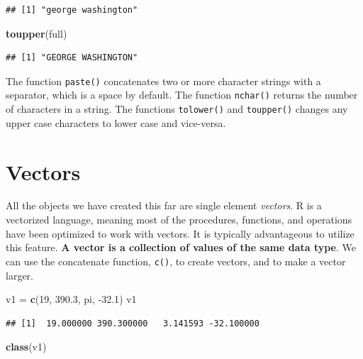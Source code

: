 \documentclass[
]{book}
\newenvironment{Shaded}{\begin{snugshade}}{\end{snugshade}}
\newcommand{\DecValTok}[1]{\textcolor[rgb]{0.00,0.00,0.81}{#1}}
\newcommand{\FloatTok}[1]{\textcolor[rgb]{0.00,0.00,0.81}{#1}}
\newcommand{\KeywordTok}[1]{\textcolor[rgb]{0.13,0.29,0.53}{\textbf{#1}}}
\newcommand{\NormalTok}[1]{#1}
\newcommand{\StringTok}[1]{\textcolor[rgb]{0.31,0.60,0.02}{#1}}
\begin{document}
\begin{verbatim}
## [1] "george washington"
\end{verbatim}

\begin{Shaded}
\begin{Highlighting}[]
\KeywordTok{toupper}\NormalTok{(full)}
\end{Highlighting}
\end{Shaded}

\begin{verbatim}
## [1] "GEORGE WASHINGTON"
\end{verbatim}

The function \texttt{paste()} concatenates two or more character strings with a separator, which is a space by default. The function \texttt{nchar()} returns the number of characters in a string. The functions \texttt{tolower()} and \texttt{toupper()} changes any upper case characters to lower case and vice-versa.

\hypertarget{vectors}{%
\section{Vectors}\label{vectors}}

All the objects we have created this far are single element \emph{vectors}. R is a vectorized language, meaning most of the procedures, functions, and operations have been optimized to work with vectors. It is typically advantageous to utilize this feature. \textbf{A vector is a collection of values of the same data type}. We can use the concatenate function, \texttt{c()}, to create vectors, and to make a vector larger.

\begin{Shaded}
\begin{Highlighting}[]
\NormalTok{v1 =}\StringTok{ }\KeywordTok{c}\NormalTok{(}\DecValTok{19}\NormalTok{, }\FloatTok{390.3}\NormalTok{, pi, }\FloatTok{-32.1}\NormalTok{)}
\NormalTok{v1}
\end{Highlighting}
\end{Shaded}

\begin{verbatim}
## [1]  19.000000 390.300000   3.141593 -32.100000
\end{verbatim}

\begin{Shaded}
\begin{Highlighting}[]
\KeywordTok{class}\NormalTok{(v1)}
\end{Highlighting}
\end{Shaded}
\end{document}
